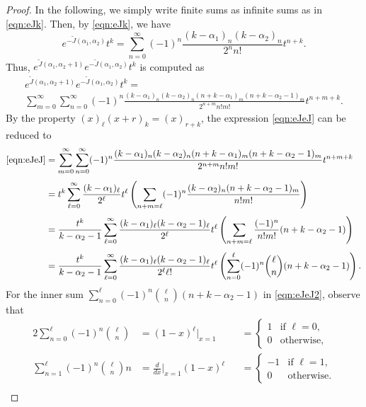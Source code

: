 \documentclass[a4paper,11pt,reqno]{amsart}
\newcommand{\0}{{\bf 0}}
\newcommand{\1}{{\bf 1}}
\theoremstyle{plain}
\theoremstyle{definition}
\numberwithin{equation}{section}
\theoremstyle{definition}
\begin{document}
\begin{appendices}
\begin{proof}
In the following, we simply write finite sums as infinite sums as in \eqref{eqn:eJk}.
Then, by \eqref{eqn:eJk}, we have 
\begin{equation*}
e^{-\tilde{J}(\alpha_1, \alpha_2)}t^k
= \sum_{n=0}^{\infty}(-1)^n\frac{(k-\alpha_1)_n(k-\alpha_2)_n}{2^nn!}t^{n+k}.
\end{equation*}
Thus, $e^{\tilde{J}(\alpha_1,\alpha_2+1)}e^{-\tilde{J}(\alpha_1,\alpha_2)}t^k$ 
is computed as
\begin{multline}
e^{\tilde{J}(\alpha_1,\alpha_2+1)}e^{-\tilde{J}(\alpha_1,\alpha_2)}t^k
=\\
\sum_{m=0}^{\infty}\sum_{n=0}^{\infty}
(-1)^n\frac{(k-\alpha_1)_n(k-\alpha_2)_n(n+k-\alpha_1)_m(n+k-\alpha_2-1)_m}{2^{n+m}n!m!} t^{n+m+k}. \label{eqn:eJeJ}
\end{multline}
By the property $(x)_\ell(x+r)_k = (x)_{r+k}$,
the expression \eqref{eqn:eJeJ} can be reduced to
\begin{align}
\eqref{eqn:eJeJ}
&=\sum_{m=0}^{\infty}\sum_{n=0}^{\infty}
(-1)^n\frac{(k-\alpha_1)_n(k-\alpha_2)_n(n+k-\alpha_1)_m(n+k-\alpha_2-1)_m}{2^{n+m}n!m!} t^{n+m+k} \nonumber \\[3pt]
&=t^k \sum_{\ell=0}^\infty \frac{(k-\alpha_1)_\ell}{2^\ell}t^\ell
\left(\sum_{n+m=\ell} (-1)^n\frac{(k-\alpha_2)_n(n+k-\alpha_2-1)_m}{n!m!}\right)\nonumber\\[3pt]
&=\frac{t^k}{k-\alpha_2-1}
 \sum_{\ell=0}^\infty \frac{(k-\alpha_1)_\ell(k-\alpha_2-1)_\ell}{2^\ell}t^\ell
\left(\sum_{n+m=\ell} \frac{(-1)^n}{n!m!}(n+k-\alpha_2-1)\right)\nonumber\\[3pt]
&=\frac{t^k}{k-\alpha_2-1}
 \sum_{\ell=0}^\infty \frac{(k-\alpha_1)_\ell(k-\alpha_2-1)_\ell}{2^\ell \ell!}t^\ell
\left(\sum_{n=0}^\ell(-1)^n\binom{\ell}{n}(n+k-\alpha_2-1)\right).\label{eqn:eJeJ2}
\end{align}
For the inner sum $\sum_{n=0}^\ell(-1)^n\binom{\ell}{n}(n+k-\alpha_2-1)$ 
in \eqref{eqn:eJeJ2}, observe that 
\begin{alignat*}{2}
\sum_{n=0}^\ell(-1)^n\binom{\ell}{n}
&= (1-x)^\ell\big\vert_{x=1} 
&&= 
\begin{cases}
1 & \text{if $\ell = 0$},\\
0 & \text{otherwise},
\end{cases}\\[5pt]
\sum_{n=1}^\ell(-1)^n\binom{\ell}{n}n
&= \frac{d}{dx}\bigg\vert_{x=1}(1-x)^\ell 
&&= 
\begin{cases}
-1 & \text{if $\ell = 1$},\\
0 & \text{otherwise}.
\end{cases}\\[3pt]

\end{alignat*}
\end{proof}
\end{appendices}
\end{document}
